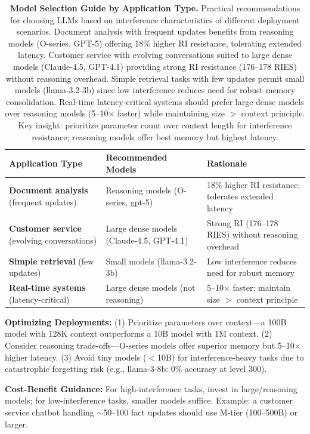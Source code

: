 \documentclass{article}
\begin{document}
\begin{table}[t]
\centering
\small
\caption{\textbf{Model Selection Guide by Application Type.}
Practical recommendations for choosing LLMs based on interference characteristics of different deployment scenarios.
Document analysis with frequent updates benefits from reasoning models (O-series, GPT-5) offering 18\% higher RI resistance, tolerating extended latency.
Customer service with evolving conversations suited to large dense models (Claude-4.5, GPT-4.1) providing strong RI resistance (176--178 RIES) without reasoning overhead.
Simple retrieval tasks with few updates permit small models (llama-3.2-3b) since low interference reduces need for robust memory consolidation.
Real-time latency-critical systems should prefer large dense models over reasoning models (5--10$\times$ faster) while maintaining size $>$ context principle.
Key insight: prioritize parameter count over context length for interference resistance; reasoning models offer best memory but highest latency.}
\setlength{\tabcolsep}{6pt}
\begin{tabular}{@{}p{4.5cm}p{5cm}p{7cm}@{}}
\toprule
Application Type & Recommended Models & Rationale \\
\midrule
\textbf{Document analysis} (frequent updates) & Reasoning models (O-series, gpt-5) & 18\% higher RI resistance; tolerates extended latency \\
\textbf{Customer service} (evolving conversations) & Large dense models (Claude-4.5, GPT-4.1) & Strong RI (176--178 RIES) without reasoning overhead \\
\textbf{Simple retrieval} (few updates) & Small models (llama-3.2-3b) & Low interference reduces need for robust memory \\
\textbf{Real-time systems} (latency-critical) & Large dense models (not reasoning) & 5--10$\times$ faster; maintain size $>$ context principle \\
\bottomrule
\end{tabular}
\end{table}

\textbf{Optimizing Deployments:}
(1) Prioritize parameters over context---a 100B model with 128K context outperforms a 10B model with 1M context.
(2) Consider reasoning trade-offs---O-series models offer superior memory but 5--10$\times$ higher latency.
(3) Avoid tiny models ($<$10B) for interference-heavy tasks due to catastrophic forgetting risk (e.g., llama-3-8b: 0\% accuracy at level 300).

\textbf{Cost-Benefit Guidance:} For high-interference tasks, invest in large/reasoning models; for low-interference tasks, smaller models suffice. Example: a customer service chatbot handling $\sim$50--100 fact updates should use M-tier (100--500B) or larger.
\end{document}
